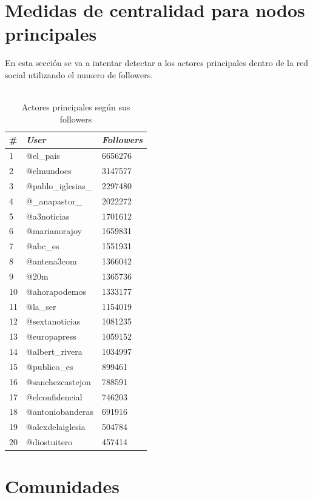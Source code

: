 \section{Medidas de centralidad para nodos principales}
\label{sec:hubs}

En esta sección se va a intentar detectar a los actores principales dentro de la red social utilizando el numero de followers.
\\ \\

\begin{table}[H]
	\centering
	\caption{Actores principales según sus followers}
	\label{tab:actores-principales-grado}
	\begin{tabular}{| l | l l |}
		\hline
		\# & \textit{User}       & \textit{Followers}    \\
		\hline
1 & @el\_pais           & 6656276 \\
2 & @elmundoes         & 3147577 \\
3 & @pablo\_iglesias\_   & 2297480 \\
4 & @\_anapastor\_       & 2022272 \\
5 & @a3noticias        & 1701612 \\
6 & @marianorajoy      & 1659831 \\
7 & @abc\_es            & 1551931 \\
8 & @antena3com        & 1366042 \\
9 & @20m               & 1365736 \\
10 & @ahorapodemos      & 1333177 \\
11 & @la\_ser            & 1154019 \\
12 & @sextanoticias     & 1081235 \\
13 & @europapress       & 1059152 \\
14 & @albert\_rivera     & 1034997 \\
15 & @publico\_es        & 899461  \\
16 & @sanchezcastejon   & 788591  \\
17 & @elconfidencial    & 746203  \\
18 & @antoniobanderas   & 691916  \\
19 & @alexdelaiglesia   & 504784  \\
20 & @diostuitero       & 457414  \\ 
		\hline
	\end{tabular}
\end{table}

\section{Comunidades}

